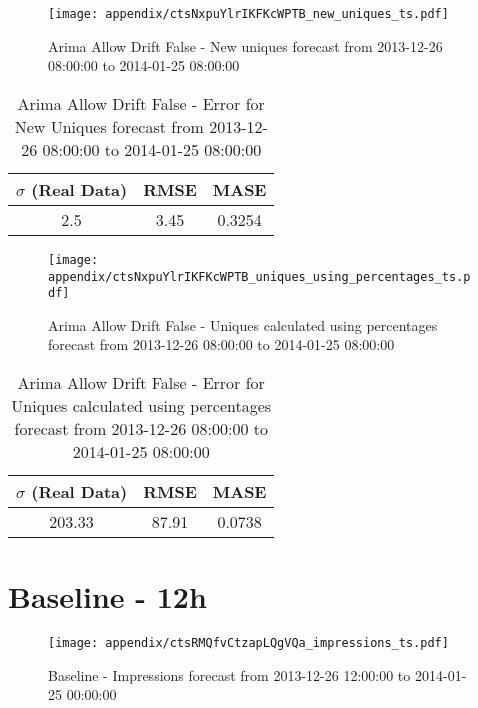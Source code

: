 \begin{figure}[H] \begin{center} \leavevmode
\texttt{[image: appendix/ctsNxpuYlrIKFKcWPTB\_new\_uniques\_ts.pdf]} \caption{
Arima Allow Drift False - New uniques forecast from 2013-12-26 08:00:00 to 2014-01-25 08:00:00} \label{fig:appendix/ctsNxpuYlrIKFKcWPTB_new_uniques_ts.pdf} \end{center}
\end{figure}

\begin{table}[H]
\centering
\footnotesize
\begin{tabular}{ccc}
$\sigma$ (Real Data) & RMSE & MASE   \\ \hline
2.5 & 3.45 & 0.3254 \\
\end{tabular}

\vspace{0.5cm}

\caption{
Arima Allow Drift False - Error for New Uniques forecast from 2013-12-26 08:00:00 to 2014-01-25 08:00:00}
\end{table}

\begin{figure}[H] \begin{center} \leavevmode
\texttt{[image: appendix/ctsNxpuYlrIKFKcWPTB\_uniques\_using\_percentages\_ts.pdf]} \caption{
Arima Allow Drift False - Uniques calculated using percentages forecast from 2013-12-26 08:00:00 to 2014-01-25 08:00:00} \label{fig:appendix/ctsNxpuYlrIKFKcWPTB_uniques_using_percentages_ts.pdf} \end{center}
\end{figure}

\begin{table}[H]
\centering
\footnotesize
\begin{tabular}{ccc}
$\sigma$ (Real Data) & RMSE & MASE   \\ \hline
203.33 & 87.91 & 0.0738 \\
\end{tabular}

\vspace{0.5cm}

\caption{
Arima Allow Drift False - Error for Uniques calculated using percentages forecast from 2013-12-26 08:00:00 to 2014-01-25 08:00:00}
\end{table}

\section{Baseline - 12h}
\begin{figure}[H] \begin{center} \leavevmode
\texttt{[image: appendix/ctsRMQfvCtzapLQgVQa\_impressions\_ts.pdf]} \caption{
Baseline - Impressions forecast from 2013-12-26 12:00:00 to 2014-01-25 00:00:00} \label{fig:appendix/ctsRMQfvCtzapLQgVQa_impressions_ts.pdf} \end{center}
\end{figure}

